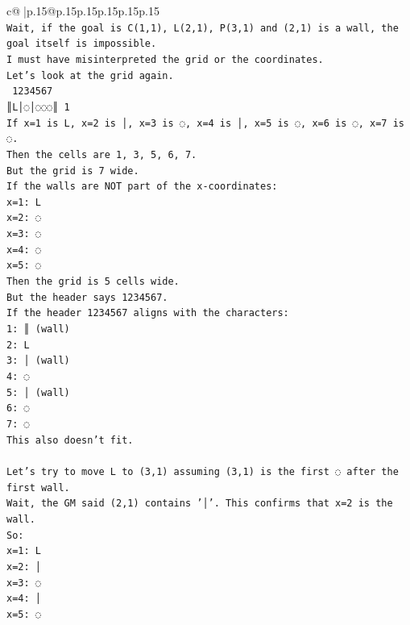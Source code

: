 \documentclass{article}
\begin{document}
{\begin{supertabular}{c@{$\;$}|p{.15\linewidth}@{}p{.15\linewidth}p{.15\linewidth}p{.15\linewidth}p{.15\linewidth}p{.15\linewidth}}
{{{\\ 
\texttt{Wait, if the goal is C(1,1), L(2,1), P(3,1) and (2,1) is a wall, the goal itself is impossible.} \\
\texttt{I must have misinterpreted the grid or the coordinates.} \\
\texttt{Let's look at the grid again.} \\
\texttt{ 1234567} \\
\texttt{║L│◌│◌◌◌║ 1} \\
\texttt{If x=1 is L, x=2 is │, x=3 is ◌, x=4 is │, x=5 is ◌, x=6 is ◌, x=7 is ◌.} \\
\texttt{Then the cells are 1, 3, 5, 6, 7.} \\
\texttt{But the grid is 7 wide.} \\
\texttt{If the walls are NOT part of the x{-}coordinates:} \\
\texttt{x=1: L} \\
\texttt{x=2: ◌} \\
\texttt{x=3: ◌} \\
\texttt{x=4: ◌} \\
\texttt{x=5: ◌} \\
\texttt{Then the grid is 5 cells wide.} \\
\texttt{But the header says 1234567.} \\
\texttt{If the header 1234567 aligns with the characters:} \\
\texttt{1: ║ (wall)} \\
\texttt{2: L} \\
\texttt{3: │ (wall)} \\
\texttt{4: ◌} \\
\texttt{5: │ (wall)} \\
\texttt{6: ◌} \\
\texttt{7: ◌} \\
\texttt{This also doesn't fit.} \\
\\ 
\texttt{Let's try to move L to (3,1) assuming (3,1) is the first ◌ after the first wall.} \\
\texttt{Wait, the GM said (2,1) contains '│'. This confirms that x=2 is the wall.} \\
\texttt{So:} \\
\texttt{x=1: L} \\
\texttt{x=2: │} \\
\texttt{x=3: ◌} \\
\texttt{x=4: │} \\
\texttt{x=5: ◌} \\
}}}
\end{supertabular}}
\end{document}
